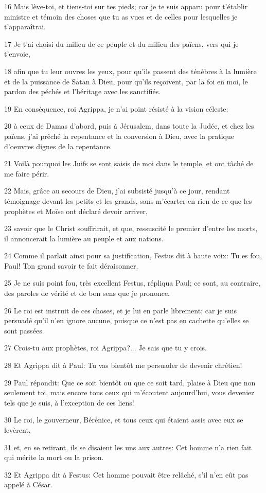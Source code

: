 \par 16 Mais lève-toi, et tiens-toi sur tes pieds; car je te suis apparu pour t'établir ministre et témoin des choses que tu as vues et de celles pour lesquelles je t'apparaîtrai.
\par 17 Je t'ai choisi du milieu de ce peuple et du milieu des païens, vers qui je t'envoie,
\par 18 afin que tu leur ouvres les yeux, pour qu'ils passent des ténèbres à la lumière et de la puissance de Satan à Dieu, pour qu'ils reçoivent, par la foi en moi, le pardon des péchés et l'héritage avec les sanctifiés.
\par 19 En conséquence, roi Agrippa, je n'ai point résisté à la vision céleste:
\par 20 à ceux de Damas d'abord, puis à Jérusalem, dans toute la Judée, et chez les païens, j'ai prêché la repentance et la conversion à Dieu, avec la pratique d'oeuvres dignes de la repentance.
\par 21 Voilà pourquoi les Juifs se sont saisis de moi dans le temple, et ont tâché de me faire périr.
\par 22 Mais, grâce au secours de Dieu, j'ai subsisté jusqu'à ce jour, rendant témoignage devant les petits et les grands, sans m'écarter en rien de ce que les prophètes et Moïse ont déclaré devoir arriver,
\par 23 savoir que le Christ souffrirait, et que, ressuscité le premier d'entre les morts, il annoncerait la lumière au peuple et aux nations.
\par 24 Comme il parlait ainsi pour sa justification, Festus dit à haute voix: Tu es fou, Paul! Ton grand savoir te fait déraisonner.
\par 25 Je ne suis point fou, très excellent Festus, répliqua Paul; ce sont, au contraire, des paroles de vérité et de bon sens que je prononce.
\par 26 Le roi est instruit de ces choses, et je lui en parle librement; car je suis persuadé qu'il n'en ignore aucune, puisque ce n'est pas en cachette qu'elles se sont passées.
\par 27 Crois-tu aux prophètes, roi Agrippa?... Je sais que tu y crois.
\par 28 Et Agrippa dit à Paul: Tu vas bientôt me persuader de devenir chrétien!
\par 29 Paul répondit: Que ce soit bientôt ou que ce soit tard, plaise à Dieu que non seulement toi, mais encore tous ceux qui m'écoutent aujourd'hui, vous deveniez tels que je suis, à l'exception de ces liens!
\par 30 Le roi, le gouverneur, Bérénice, et tous ceux qui étaient assis avec eux se levèrent,
\par 31 et, en se retirant, ils se disaient les uns aux autres: Cet homme n'a rien fait qui mérite la mort ou la prison.
\par 32 Et Agrippa dit à Festus: Cet homme pouvait être relâché, s'il n'en eût pas appelé à César.


